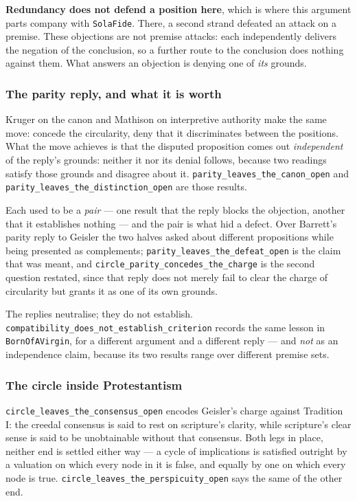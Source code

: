 \documentclass[11pt]{article}
\begin{document}
\textbf{Redundancy does not defend a position here}, which is where this argument parts company with \texttt{Sola\allowbreak{}Fide}. There, a second strand defeated an attack on a premise. These objections are not premise attacks: each independently delivers the negation of the conclusion, so a further route to the conclusion does nothing against them. What answers an objection is denying one of \emph{its} grounds.

\subsubsection*{The parity reply, and what it is worth}
Kruger on the canon and Mathison on interpretive authority make the same move: concede the circularity, deny that it discriminates between the positions. What the move achieves is that the disputed proposition comes out \emph{independent} of the reply's grounds: neither it nor its denial follows, because two readings satisfy those grounds and disagree about it. \texttt{parity\_\allowbreak{}leaves\_\allowbreak{}the\_\allowbreak{}canon\_\allowbreak{}open} and \texttt{parity\_\allowbreak{}leaves\_\allowbreak{}the\_\allowbreak{}distinction\_\allowbreak{}open} are those results.

Each used to be a \emph{pair} — one result that the reply blocks the objection, another that it establishes nothing — and the pair is what hid a defect. Over Barrett's parity reply to Geisler the two halves asked about different propositions while being presented as complements; \texttt{parity\_\allowbreak{}leaves\_\allowbreak{}the\_\allowbreak{}defeat\_\allowbreak{}open} is the claim that was meant, and \texttt{circle\_\allowbreak{}parity\_\allowbreak{}concedes\_\allowbreak{}the\_\allowbreak{}charge} is the second question restated, since that reply does not merely fail to clear the charge of circularity but grants it as one of its own grounds.

The replies neutralise; they do not establish. \texttt{compatibility\_\allowbreak{}does\_\allowbreak{}not\_\allowbreak{}establish\_\allowbreak{}criterion} records the same lesson in \texttt{Born\allowbreak{}Of\allowbreak{}AVirgin}, for a different argument and a different reply — and \emph{not} as an independence claim, because its two results range over different premise sets.

\subsubsection*{The circle inside Protestantism}
\texttt{circle\_\allowbreak{}leaves\_\allowbreak{}the\_\allowbreak{}consensus\_\allowbreak{}open} encodes Geisler's charge against Tradition I: the creedal consensus is said to rest on scripture's clarity, while scripture's clear sense is said to be unobtainable without that consensus. Both legs in place, neither end is settled either way — a cycle of implications is satisfied outright by a valuation on which every node in it is false, and equally by one on which every node is true. \texttt{circle\_\allowbreak{}leaves\_\allowbreak{}the\_\allowbreak{}perspicuity\_\allowbreak{}open} says the same of the other end.
\end{document}
